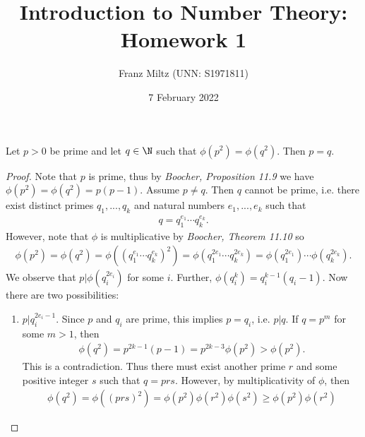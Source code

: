\documentclass{article}
\begin{document}
\title{Introduction to Number Theory: Homework 1}
\author{Franz Miltz (UNN: S1971811)}
\date{7 February 2022}
\maketitle

\begin{claim*}[1]
   Let $p>0$ be prime and let $q\in\N$ such that $\phi\left(p^2\right) = \phi\left(q^2\right)$.
   Then $p=q$.
   \begin{proof}
      Note that $p$ is prime, thus by \emph{Boocher, Proposition 11.9} we
      have $\phi\left(p^2\right)=\phi\left(q^2\right)=p(p-1)$. Assume $p\not= q$.
      Then $q$ cannot be prime, i.e. there exist distinct primes $q_1,...,q_k$ and natural
      numbers $e_1,...,e_k$ such that
      \begin{align*}
         q = q_1^{e_1}\cdots q_k^{e_k}.
      \end{align*}
      However, note that $\phi$ is multiplicative by \emph{Boocher, Theorem 11.10}
      so
      \begin{align}
         \label{factorisation}
         \phi(p^2)
         =\phi(q^2)
         =\phi\left(\left(q_1^{e_1}\cdots q_k^{e_k}\right)^2\right)
         =\phi\left(q_1^{2e_1}\cdots q_k^{2e_k}\right)
         =\phi\left(q_1^{2e_1}\right)\cdots\phi\left(q_k^{2e_k}\right).
      \end{align}
      We observe that $p|\phi\left(q_i^{2e_i}\right)$ for some $i$.
      Further, $\phi\left(q_i^k\right)=q_i^{k-1}(q_i-1)$. Now there are two possibilities:
      \begin{enumerate}
         \item $p|q_i^{2e_i-1}$. Since $p$ and $q_i$ are prime, this implies
               $p=q_i$, i.e. $p|q$. If $q=p^m$ for some $m>1$, then \begin{align*}
                  \phi\left(q^2\right)=p^{2k-1}(p-1)=p^{2k-3}\phi\left(p^2\right)
                  >\phi\left(p^2\right).
               \end{align*}
               This is a contradiction. Thus there must exist another prime $r$ and some 
               positive integer $s$ such that $q=prs$. However, by multiplicativity of $\phi$,
               then
               \begin{align*}
                  \phi\left(q^2\right)
                  =    \phi\left((prs)^2\right)
                  =    \phi\left(p^2\right)\phi\left(r^2\right)\phi(s^2)
                  \geq \phi\left(p^2\right)\phi\left(r^2\right)

\end{align*}
\end{enumerate}
\end{proof}
\end{claim*}
\end{document}
